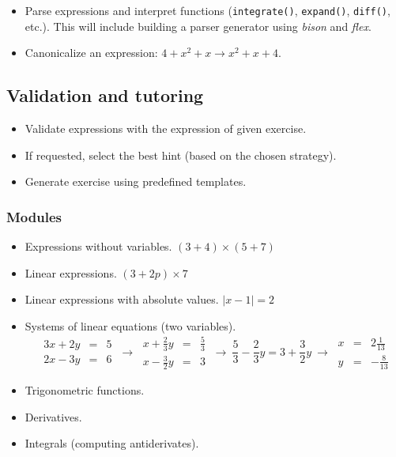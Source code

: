 \documentclass[10pt,a4paper]{article}
\begin{document}
\begin{itemize}
    \item Parse expressions and interpret functions (\texttt{integrate()},
    \texttt{expand()}, \texttt{diff()}, etc.). This will include building a
    parser generator using \emph{bison} and \emph{flex}.
    \item Canonicalize an expression: $4 + x^2 + x \rightarrow x^2 + x + 4$.
\end{itemize}

\subsection{Validation and tutoring}

\begin{itemize}
    \item Validate expressions with the expression of given exercise.
    \item If requested, select the best hint (based on the chosen strategy).
    \item Generate exercise using predefined templates.
\end{itemize}

\subsubsection{Modules}

\begin{itemize}
    \item Expressions without variables. $(3+4) \times (5+7)$
    \item Linear expressions. $(3+2p) \times 7$
    \item Linear expressions with absolute values. $|x-1| = 2$
    \item Systems of linear equations (two variables).
    $$ \
    \begin{array}{|rcr|}
    3x + 2y & = & 5 \\
    2x - 3y & = & 6
    \end{array}
    \
    \rightarrow
    \
    \begin{array}{|rcr|}
    x + \frac{2}{3}y & = & \frac{5}{3} \\
    x - \frac{3}{2}y & = & 3
    \end{array}
    \
    \rightarrow
    \
    \frac{5}{3} - \frac{2}{3}y = 3 + \frac{3}{2}y
    \
    \rightarrow
    \
    \begin{array}{|rcr|}
    x & = & 2\frac{1}{13} \\
    y & = & -\frac{8}{13}
    \end{array}
    $$
    \item Trigonometric functions.
    \item Derivatives.
    \item Integrals (computing antiderivates).
\end{itemize}
\end{document}
